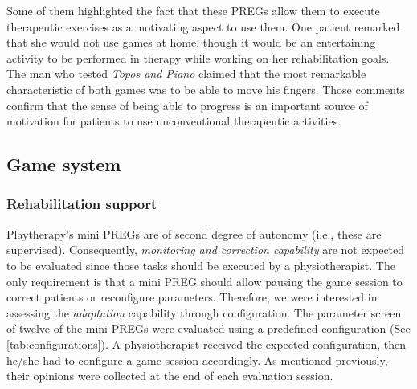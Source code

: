 Some of them highlighted the fact that these \acp{PREG} allow them to execute therapeutic exercises as a motivating aspect to use them. One patient remarked that she would not use games at home, though it would be an entertaining activity to be performed in therapy while working on her rehabilitation goals. The man who tested \textit{Topos and Piano} claimed that the most remarkable characteristic of both games was to be able to move his fingers. Those comments confirm that the sense of being able to progress is an important source of motivation for patients to use unconventional therapeutic activities.

\subsection{Game system}
\subsubsection{Rehabilitation support}
Playtherapy's mini \acp{PREG} are of second degree of autonomy (i.e., these are supervised). Consequently, \textit{monitoring and correction capability} are not expected to be evaluated since those tasks should be executed by a physiotherapist. The only requirement is that a mini \ac{PREG} should allow pausing the game session to correct patients or reconfigure parameters.
Therefore, we were interested in assessing the \textit{adaptation} capability through configuration. The parameter screen of twelve of the mini \acp{PREG} were evaluated using a predefined configuration (See \autoref{tab:configurations}). A physiotherapist received the expected configuration, then he/she had to configure a game session accordingly. As mentioned previously, their opinions were collected at the end of each evaluation session.

